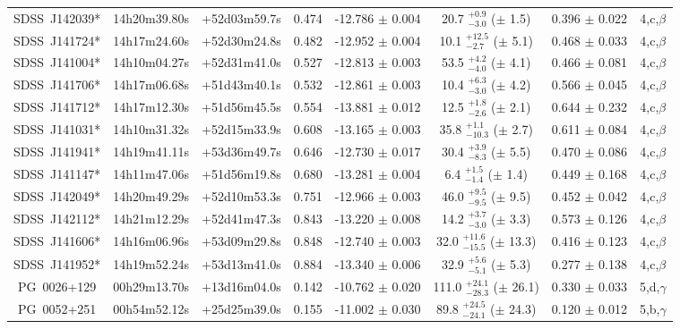 \documentclass[a4paper,fleqn,usenatbib]{mnras}
\begin{document}
\begin{appendix}
\begin{longtable}{cccccccc}
SDSS~J142039* & 14h20m39.80s & +52d03m59.7s & 0.474 & -12.786 $\pm$ 0.004 & 20.7 $_{-3.0}^{+0.9}$ ($\pm$ 1.5) & 0.396 $\pm$ 0.022 & 4,c,$\beta$ \\
SDSS~J141724* & 14h17m24.60s & +52d30m24.8s & 0.482 & -12.952 $\pm$ 0.004 & 10.1 $_{-2.7}^{+12.5}$ ($\pm$ 5.1) & 0.468 $\pm$ 0.033 & 4,c,$\beta$ \\
SDSS~J141004* & 14h10m04.27s & +52d31m41.0s & 0.527 & -12.813 $\pm$ 0.003 & 53.5 $_{-4.0}^{+4.2}$ ($\pm$ 4.1) & 0.466 $\pm$ 0.081 & 4,c,$\beta$ \\
SDSS~J141706* & 14h17m06.68s & +51d43m40.1s & 0.532 & -12.861 $\pm$ 0.003 & 10.4 $_{-3.0}^{+6.3}$ ($\pm$ 4.2) & 0.566 $\pm$ 0.045 & 4,c,$\beta$ \\
SDSS~J141712* & 14h17m12.30s & +51d56m45.5s & 0.554 & -13.881 $\pm$ 0.012 & 12.5 $_{-2.6}^{+1.8}$ ($\pm$ 2.1) & 0.644 $\pm$ 0.232 & 4,c,$\beta$ \\
SDSS~J141031* & 14h10m31.32s & +52d15m33.9s & 0.608 & -13.165 $\pm$ 0.003 & 35.8 $_{-10.3}^{+1.1}$ ($\pm$ 2.7) & 0.611 $\pm$ 0.084 & 4,c,$\beta$ \\
SDSS~J141941* & 14h19m41.11s & +53d36m49.7s & 0.646 & -12.730 $\pm$ 0.017 & 30.4 $_{-8.3}^{+3.9}$ ($\pm$ 5.5) & 0.470 $\pm$ 0.086 & 4,c,$\beta$ \\
SDSS~J141147* & 14h11m47.06s & +51d56m19.8s & 0.680 & -13.281 $\pm$ 0.004 & 6.4 $_{-1.4}^{+1.5}$ ($\pm$ 1.4) & 0.449 $\pm$ 0.168 & 4,c,$\beta$ \\
SDSS~J142049* & 14h20m49.29s & +52d10m53.3s & 0.751 & -12.966 $\pm$ 0.003 & 46.0 $_{-9.5}^{+9.5}$ ($\pm$ 9.5) & 0.452 $\pm$ 0.042 & 4,c,$\beta$ \\
SDSS~J142112* & 14h21m12.29s & +52d41m47.3s & 0.843 & -13.220 $\pm$ 0.008 & 14.2 $_{-3.0}^{+3.7}$ ($\pm$ 3.3) & 0.573 $\pm$ 0.126 & 4,c,$\beta$ \\
SDSS~J141606* & 14h16m06.96s & +53d09m29.8s & 0.848 & -12.740 $\pm$ 0.003 & 32.0 $_{-15.5}^{+11.6}$ ($\pm$ 13.3) & 0.416 $\pm$ 0.123 & 4,c,$\beta$ \\
SDSS~J141952* & 14h19m52.24s & +53d13m41.0s & 0.884 & -13.340 $\pm$ 0.006 & 32.9 $_{-5.1}^{+5.6}$ ($\pm$ 5.3) & 0.277 $\pm$ 0.138 & 4,c,$\beta$ \\
PG~0026+129 & 00h29m13.70s & +13d16m04.0s & 0.142 & -10.762 $\pm$ 0.020 & 111.0 $_{-28.3}^{+24.1}$ ($\pm$ 26.1) & 0.330 $\pm$ 0.033 & 5,d,$\gamma$ \\
PG~0052+251 & 00h54m52.12s & +25d25m39.0s & 0.155 & -11.002 $\pm$ 0.030 & 89.8 $_{-24.1}^{+24.5}$ ($\pm$ 24.3) & 0.120 $\pm$ 0.012 & 5,b,$\gamma$ \\

\end{longtable}
\end{appendix}
\end{document}
